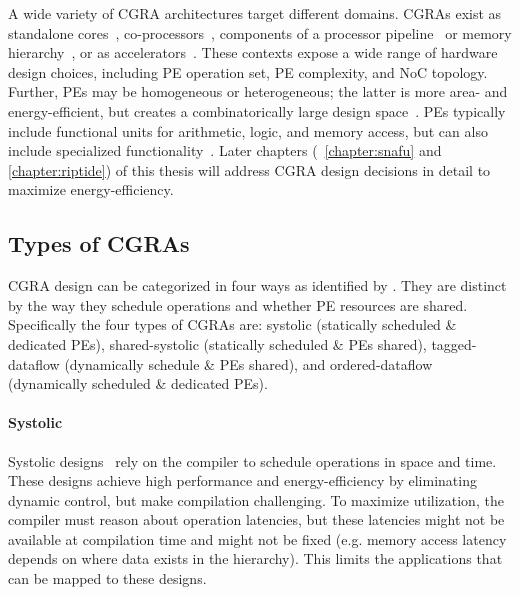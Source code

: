 A wide variety of CGRA architectures target different domains.
%
CGRAs exist as standalone cores~\cite{trips,raw,swanson2003wavescalar,mishra2006tartan},
co-processors~\cite{tan2018stitch,hauser1997garp,beret,seed,adres,charm,camel,goldstein2000piperench},
components of a processor pipeline~\cite{dyser,dynaspam,chimera}
or memory hierarchy~\cite{livia},
or as accelerators~\cite{plasticine,wave,gorgon,capstan,q100,nowatzki:isca17:stream-dataflow,weng2020hybrid,dadu2019towards,polygraph,taskstream,voitsechov2014single,nguyen2021fifer,morphosys,ppa,fpca}.
%
These contexts expose a wide range of hardware design choices, including PE
operation set, PE complexity, and NoC topology.
% 
Further, PEs may be homogeneous or heterogeneous; the latter is more area- and
energy-efficient, but creates a combinatorically large design space~\cite{revamp}.
% 
PEs typically include functional units for arithmetic, logic,
and memory access, but can also include 
specialized functionality~\cite{snafu,weng2020dsagen,dadu2019towards,q100,gorgon,capstan,polygraph,taskstream}.
% 
Later chapters (~\autoref{chapter:snafu} and \autoref{chapter:riptide}) of this thesis will address CGRA design decisions in detail to maximize energy-efficiency.

\subsection{Types of CGRAs}
CGRA design can be categorized in four ways as identified by \cite{weng2020hybrid}.
% 
They are distinct by the way they schedule operations and whether PE resources are shared.
% 
Specifically the four types of CGRAs are: systolic (statically scheduled \& dedicated PEs), shared-systolic (statically scheduled \& PEs shared),  tagged-dataflow (dynamically schedule \& PEs shared), and ordered-dataflow (dynamically scheduled \& dedicated PEs).

\paragraph{Systolic}
Systolic designs~\cite{tartan,piperench,fpca,warp,nowatzki:isca17:stream-dataflow} rely on the compiler to schedule operations in space and time.
% 
These designs achieve high performance and energy-efficiency by eliminating dynamic control, but make compilation challenging.
% 
To maximize utilization, the compiler must reason about operation latencies, but these latencies might not be available at compilation time and might not be fixed (e.g. memory access latency depends on where data exists in the hierarchy).
% 
This limits the applications that can be mapped to these designs.

